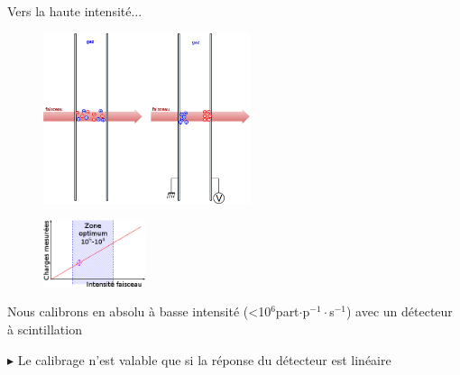 \documentclass[10pt]{beamer}
\begin{document}
\begin{frame}[fragile]{Vers la haute intensité...}
\begin{minipage}[h]{.5\linewidth}
\begin{figure}[t]
\begin{center}
\includegraphics[height=5cm]{IC_bd.png} 
\end{center}
\end{figure}
\end{minipage}
\hfill
\begin{minipage}[h]{.48\linewidth}
\begin{figure}[h]
\begin{center}
\includegraphics[width=3cm]{Ch_bd.png}
\end{center}
\end{figure}
\vspace{2ex}
Nous calibrons en absolu à basse intensité (<10$^6$part$\cdot$p$^{-1}\cdot$s$^{-1}$) avec un détecteur à scintillation
\end{minipage}

$\blacktriangleright$ Le calibrage n'est valable que si la réponse du détecteur est \alert{linéaire} 
\end{frame}
\end{document}
